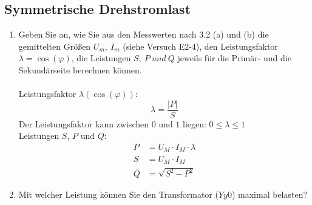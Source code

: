 \subsection{Symmetrische Drehstromlast }
\begin{enumerate}[label=\alph*)]
  \item Geben Sie an, wie Sie aus den Messwerten nach 3.2 (a) und (b) die gemittelten
        Größen $U_m,\ I_m$ (siehe Versuch E2-4), den Leistungsfaktor
        $\lambda=\cos(\varphi)$, die Leistungen $S,\ P\ und\ Q$ jeweils für die Primär-
        und die Sekundärseite berechnen können.\\ \ \\
        Leistungsfaktor $\lambda(\cos (\varphi))$:
        \[ \lambda = \frac{|P|}{S} \]
        Der Leistungsfaktor kann zwischen $0$ und $1$ liegen: $0 \leq \lambda \leq 1 $\\
        Leistungen $S$, $P$ und $Q$:\\
        \begin{align*}
        	P &= U_M\cdot I_M\cdot \lambda\\
        	S &= U_M\cdot I_M\\
        	Q &= \sqrt{S^2-P^2}
        \end{align*}
        
  \item Mit welcher Leistung können Sie den Transformator ($Yy0$) maximal belasten?
\end{enumerate}
